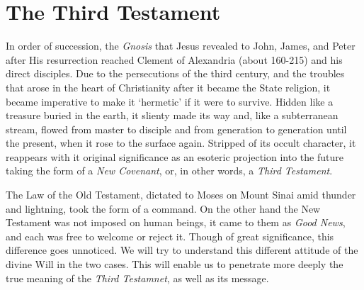 \section{The Third Testament}

\begin{quotationx}
In order of succession, the \emph{Gnosis} that Jesus revealed to John, James, and Peter after His resurrection reached Clement of Alexandria (about 160-215) and his direct disciples. Due to the persecutions of the third century, and the troubles that arose in the heart of Christianity after it became the State religion, it became imperative to make it `hermetic' if it were to survive. Hidden like a treasure buried in the earth, it slienty made its way and, like a subterranean stream, flowed from master to disciple and from generation to generation until the present, when it rose to the surface again. Stripped of its occult character, it reappears with it original significance as an esoteric projection into the future taking the form of a \emph{New Covenant}, or, in other words, a \emph{Third Testament}.

The Law of the Old Testament, dictated to Moses on Mount Sinai amid thunder and lightning, took the form of a command. On the other hand the New Testament was not imposed on human beings, it came to them as \emph{Good News}, and each was free to welcome or reject it. Though of great significance, this difference goes unnoticed. We will try to understand this different attitude of the divine Will in the two cases. This will enable us to penetrate more deeply the true meaning of the \emph{Third Testamnet}, as well as its message.


\end{quotationx}




